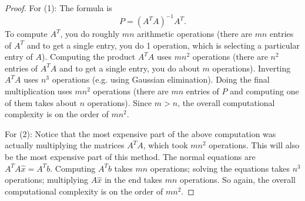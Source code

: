 \documentclass{article}
\theoremstyle{definition}
\begin{document}
\begin{proof}
For (1): The formula is 
\[P=(A^TA)^{-1}A^T.\]
To compute $A^T$, you do roughly $mn$ arithmetic operations (there are $mn$ entries of $A^T$ and to get a single entry, you do 1 operation, which is selecting a particular entry of $A$). Computing the product $A^T A$ uses $mn^2$ operations (there are $n^2$ entries of $A^T A$ and to get a single entry, you do about $m$ operations). Inverting $A^T A$ uses $n^3$ operations (e.g. using Gaussian elimination). Doing the final multiplication uses $m n^2$ operations (there are $mn$ entries of $P$ and computing one of them takes about $n$ operations). Since $m>n$, the overall computational complexity is on the order of $mn^2$.

For (2): Notice that the most expensive part of the above computation was actually multiplying the matrices $A^TA$, which took $mn^2$ operations. This will also be the most expensive part of this method. The normal equations are $A^T A \hat{x}= A^T b$. Computing $A^T b$ takes $mn$ operations; solving the equations takes $n^3$ operations; multiplying $A\hat{x}$ in the end takes $mn$ operations. So again, the overall computational complexity is on the order of $mn^2$.
\end{proof}


 
\end{document}
